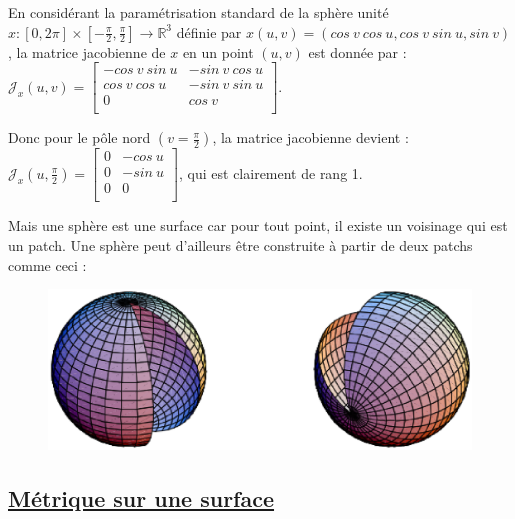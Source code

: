 \documentclass {report}
\newcommand{\R}{\mathbb{R}}
\begin{document}
En considérant la paramétrisation standard de la sphère unité\\ $x: [0,2\pi]\times \left[-\frac{\pi}{2},\frac{\pi}{2}\right]\rightarrow \R^3$ définie par $x(u,v)=(cos\ v\ cos\ u, cos\ v\ sin\ u, sin\ v)$, la matrice jacobienne de $x$ en un point $(u,v)$ est donnée par : \\
$\mathscr{J}_x(u,v) = \left[\begin{array}{cc} 
-cos\ v\ sin\ u & -sin\ v\ cos\ u\\
cos\ v\ cos\ u & -sin\ v\ sin\ u \\ 
0 & cos\ v \\ \end{array}\right]$.

Donc pour le pôle nord $\left(v=\frac{\pi}{2}\right)$, la matrice jacobienne devient : \\
$\mathscr{J}_x\left(u,\frac{\pi}{2}\right) = \left[\begin{array}{cc} 
0 & -cos\ u\\
0 & -sin\ u \\ 
0 & 0 \\ \end{array}\right]$, qui est clairement de rang 1.

Mais une sphère est une surface car pour tout point, il existe un voisinage qui est un patch. Une sphère peut d'ailleurs être construite à partir de deux patchs comme ceci :
\begin{figure}[h!]
      \centering 
      \includegraphics[scale=0.5]{Images_Fichiers/1.eps}
\end{figure}
  
\subsection[Métrique sur une surface]{\uline{Métrique sur une surface}}
\end{document}
